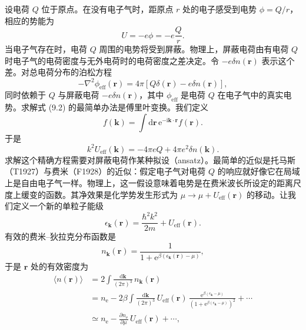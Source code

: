 设电荷 $Q$ 位于原点。在没有电子气时，距原点 $r$ 处的电子感受到电势 $\phi=Q/r$，相应的势能为
\begin{equation*}
U=-e\phi=-e\frac{Q}{r}.\tag{9.1}
\end{equation*}
当电子气存在时，电荷 $Q$ 周围的电势将受到屏蔽。物理上，屏蔽电荷由有电荷 $Q$ 时电子气的电荷密度与无外电荷时的电荷密度之差决定。令 $-e\delta n(\mathbf{r})$ 表示这个差。对总电荷分布的泊松方程
\begin{equation*}
-\nabla^2\phi_{\mathrm{eff}}(\mathbf{r})=4\pi\left[Q\delta(\mathbf{r})-e\delta n(\mathbf{r})\right],\tag{9.2}
\end{equation*}
同时依赖于 $Q$ 与屏蔽电荷 $-e\delta n(\mathbf{r})$，其中 $\phi_{\mathrm{eff}}$ 是电荷 $Q$ 在电子气中的真实电势。求解式 (9.2) 的最简单办法是傅里叶变换。我们定义
\begin{equation*}
f(\mathbf{k})=\int\mathrm{d}\mathbf{r}\,\mathrm{e}^{-\mathrm{i}\mathbf{k}\cdot\mathbf{r}}f(\mathbf{r}).\tag{9.3}
\end{equation*}
于是
\begin{equation*}
k^2U_{\mathrm{eff}}(\mathbf{k})=-4\pi eQ+4\pi e^2\delta n(\mathbf{k}).\tag{9.4}
\end{equation*}
求解这个精确方程需要对屏蔽电荷作某种拟设（ansatz）。最简单的近似是托马斯（T1927）与费米（F1928）的近似：假定电子气对电荷 $Q$ 的响应就好像它在局域上是自由电子气一样。物理上，这一假设意味着电势是在费米波长所设定的距离尺度上缓变的函数。其净效果是化学势发生形式为 $\mu\to\mu+U_{\mathrm{eff}}(\mathbf{r})$ 的移动。让我们定义一个新的单粒子能级
\begin{equation*}
\epsilon_{\mathbf{k}}(\mathbf{r})=\frac{\hbar^2k^2}{2m}+U_{\mathrm{eff}}(\mathbf{r}).\tag{9.5}
\end{equation*}
有效的费米–狄拉克分布函数是
\begin{equation*}
n_{\mathbf{k}}(\mathbf{r})=\frac{1}{1+\mathrm{e}^{\beta(\epsilon_{\mathbf{k}}(\mathbf{r})-\mu)}},\tag{9.6}
\end{equation*}
于是 $\mathbf{r}$ 处的有效密度为
\begin{equation*}
\begin{aligned}
\langle n(\mathbf{r})\rangle&=2\int\frac{\mathrm{d}\mathbf{k}}{(2\pi)^3}\,n_{\mathbf{k}}(\mathbf{r})\\
&=n_{\mathrm{e}}-2\beta\int\frac{\mathrm{d}\mathbf{k}}{(2\pi)^3}\,U_{\mathrm{eff}}(\mathbf{r})\,\frac{\mathrm{e}^{\beta(\epsilon_{\mathbf{k}}-\mu)}}{\left(1+\mathrm{e}^{\beta(\epsilon_{\mathbf{k}}-\mu)}\right)^2}+\cdots\\
&\simeq n_{\mathrm{e}}-\frac{\partial n_{\mathrm{e}}}{\partial\mu}\,U_{\mathrm{eff}}(\mathbf{r})+\cdots,
\end{aligned}\tag{9.7}
\end{equation*}

